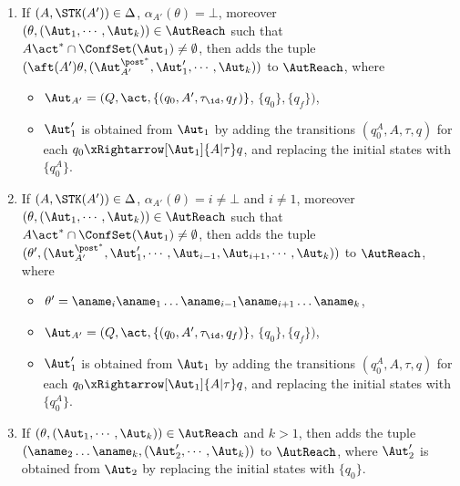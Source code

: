 \smallskip
\fbox
{
\begin{minipage}{0.9\textwidth}
\begin{enumerate}
    \item If $(A,\STK(A')) \in\Delta$, $\alpha_{A'}(\theta) = \bot$, moreover $(\theta, (\Aut_1,\cdots,\Aut_k)) \in \AutReach$ such that $A\act^*\cap\ConfSet(\Aut_1)\neq \emptyset$, 
        then adds the tuple $(\aft(A')\theta, (\Aut_{A'}^{\post^*},\Aut_1',\cdots,\Aut_k))$ to $\AutReach$, where 
        \begin{itemize}
            \item $\Aut_{A'} = (Q, \act, \{(q_0, A', \tau_{\id}, q_f)\}$, $\{q_0\},\{q_f\})$,
            \item $\Aut_1'$ is obtained from $\Aut_1$ by adding the transitions $(q_0^{A},A,\tau,q)$ for each $q_0\xRightarrow[\Aut_1]{A | \tau} q$, and replacing the initial states with $\{q_0^{A}\}$.
        \end{itemize}
    \item If $(A,\STK(A')) \in\Delta$, $\alpha_{A'}(\theta) = i \neq\bot$ and $i\neq 1$, moreover $(\theta, (\Aut_1,\cdots,\Aut_k)) \in \AutReach$ such that $A\act^*\cap\ConfSet(\Aut_1)\neq \emptyset$, 
        then adds the tuple $(\theta', (\Aut_{A'}^{\post^*},\Aut_1',\cdots,\Aut_{i-1},\Aut_{i+1},\cdots,\Aut_{k}))$ to $\AutReach$, where
        \begin{itemize}
            \item $\theta' = \aname_i\aname_1\dots\aname_{i-1}\aname_{i+1}\dots\aname_k$,
            \item $\Aut_{A'} = (Q, \act, \{(q_0, A', \tau_{\id}, q_f)\}$, $\{q_0\},\{q_f\})$,
            \item $\Aut_1'$ is obtained from $\Aut_1$ by adding the transitions $(q_0^{A},A,\tau,q)$ for each $q_0\xRightarrow[\Aut_1]{A | \tau} q$, and replacing the initial states with $\{q_0^{A}\}$.
        \end{itemize}
    \item If $(\theta, (\Aut_1,\cdots,\Aut_k)) \in \AutReach$ and $k>1$, then adds the tuple $(\aname_2\dots\aname_k, (\Aut_2',\cdots,\Aut_k))$ to $\AutReach$,
        where $\Aut_2'$ is obtained from $\Aut_2$ by replacing the initial states with $\{q_0\}$.
\end{enumerate}
\end{minipage}
}


